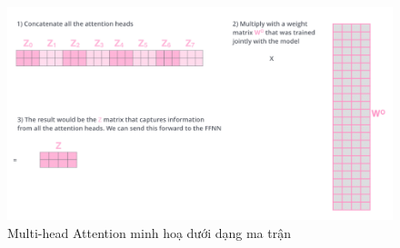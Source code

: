 \begin{enumerate}
    \begin{figure}[htb]
        \centering
        \includegraphics[width=\textwidth]{image/multi-head-illustration.png}
        \caption{Multi-head Attention minh hoạ dưới dạng ma trận}
        \label{figure:multi-head-illustration}
    \end{figure}

\end{enumerate}
